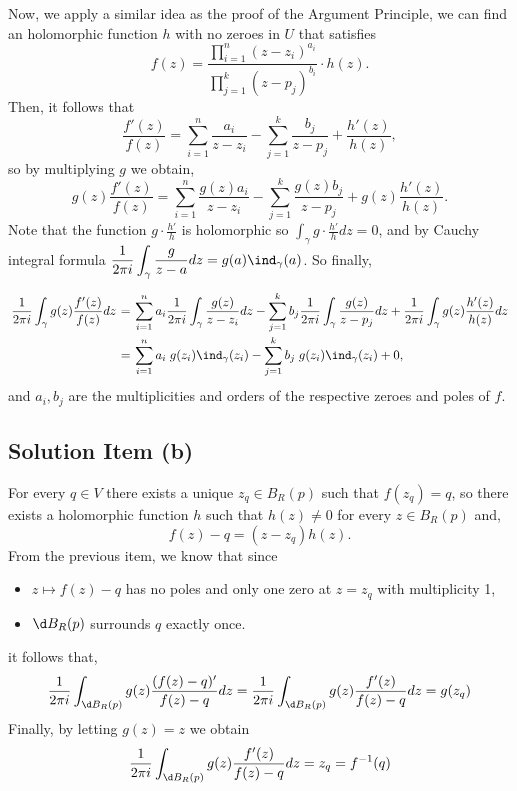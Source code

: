 Now, we apply a similar idea as the proof of the Argument Principle, we can find an holomorphic function $h$ with no zeroes in $U$ that satisfies
\[ f(z) = \frac{\prod_{i = 1}^{n} (z-z_i)^{a_i}}{\prod_{j = 1}^{k} (z-p_j)^{b_i}} \cdot h(z). \]
Then, it follows that
\[ \frac{f'(z)}{f(z)} = \sum_{i = 1}^n \frac{a_i}{z-z_i} - \sum_{j = 1}^{k} \frac{b_j}{z-p_j} + \frac{h'(z)}{h(z)}, \]
so by multiplying $g$ we obtain,
\[ g(z)\frac{f'(z)}{f(z)} = \sum_{i = 1}^n \frac{g(z)a_i}{z-z_i} - \sum_{j = 1}^{k} \frac{g(z)b_j}{z-p_j} + g(z)\frac{h'(z)}{h(z)}. \]
Note that the function $\displaystyle g\cdot\frac{h'}{h}$ is holomorphic so $\displaystyle \int_\gamma g\cdot\frac{h'}{h} dz = 0$, and by Cauchy integral formula $\displaystyle \frac{1}{2\pi i}\int_\gamma \frac{g}{z-a} dz = g(a) \ind_\gamma(a)$. So finally,
\[ \everymath{\displaystyle}
\arraycolsep=1.8pt\def\arraystretch{2.5}
\begin{array}{rcl}
    \frac{1}{2\pi i}  \int_\gamma g(z)\frac{f'(z)}{f(z)} dz & = & \sum_{i = 1}^n a_i \frac{1}{2\pi i}\int_\gamma \frac{g(z)}{z-z_i} dz- \sum_{j = 1}^{k} b_j \frac{1}{2\pi i} \int_\gamma\frac{g(z)}{z-p_j}dz + \frac{1}{2\pi i} \int_\gamma g(z)\frac{h'(z)}{h(z)} dz\\
    & = & \sum_{i = 1}^n a_i\; g(z_i) \ind_{\gamma}(z_i) - \sum_{j = 1}^{k} b_j\; g(z_i) \ind_{\gamma}(z_i) + 0,
\end{array} \]
and $a_i,b_j$ are the multiplicities and orders of the respective zeroes and poles of $f$.

\subsection*{Solution Item (b)}

For every $q \in V$ there exists a unique $z_q \in B_R(p)$ such that $f(z_q) = q$, so there exists a holomorphic function $h$ such that $h(z) \neq 0$ for every $z \in B_R(p)$ and,
\[ f(z)-q = (z-z_q)h(z). \]
From the previous item, we know that since
\begin{itemize}
    \item $z\mapsto f(z)-q$ has no poles and only one zero at $z = z_q$ with multiplicity 1,
    \item $\d B_R(p)$ surrounds $q$ exactly once.
\end{itemize}
it follows that,
\[ \frac{1}{2\pi i} \int_{\d B_R(p)} g(z)\frac{(f(z)-q)'}{f(z)-q} dz = \frac{1}{2\pi i}\int_{\d B_R(p)} g(z)\frac{f'(z)}{f(z)-q} dz = g(z_q) \]
Finally, by letting $g(z) = z$ we obtain
\[ \frac{1}{2\pi i}\int_{\d B_R(p)} g(z)\frac{f'(z)}{f(z)-q} dz = z_q = f^{-1}(q) \]